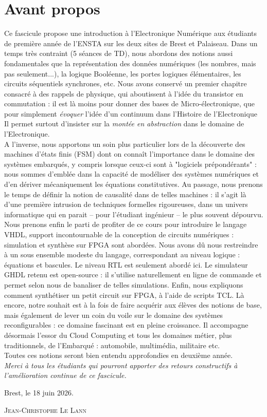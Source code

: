 \chapter*{Avant propos}

Ce fascicule propose une introduction à l'Electronique Numérique aux étudiants de première année
de l'ENSTA sur les deux sites de Brest et Palaiseau. Dans un temps très contraint (5 séances de TD), nous abordons des notions
aussi fondamentales que la représentation des données numériques (les nombres, mais pas seulement...),
la logique Booléenne, les portes logiques élémentaires, les circuits séquentiels synchrones, etc. Nous avons conservé
un premier chapitre consacré à des rappels de physique, qui aboutissent à l'idée du transistor en commutation : il est là
moins pour donner des bases de Micro-électronique, que pour simplement {\it évoquer} l'idée d'un continuum dans l'Histoire de l'Electronique
Il permet surtout d'insister sur la {\it montée en abstraction} dans le domaine de l'Electronique.\\

A l'inverse, nous apportons un soin plus particulier lors de la découverte des machines d'états finis (FSM) dont on connaît l'importance dans le domaine
des systèmes embarqués, y compris lorsque ceux-ci sont à "logiciels prépondérants" : nous sommes  d'emblée
dans la capacité de modéliser des systèmes numériques et d'en dériver mécaniquement les équations constitutives.
Au passage, nous prenons le temps de définir la notion de causalité dans de telles machines : il s'agit là
d'une première intrusion de techniques formelles rigoureuses, dans un univers informatique qui en parait -- pour l'étudiant ingénieur -- le plus souvent
dépourvu.\\

Nous prenons enfin le parti de profiter de ce cours pour introduire le langage VHDL, support incontournable
de la conception de circuits numériques : simulation et synthèse sur FPGA sont abordées. Nous avons dû nous restreindre
à un sous ensemble modeste du langage, correspondant au niveau logique : équations et bascules. Le niveau RTL est seulement abordé ici.
Le simulateur GHDL retenu est open-source : il s'utilise naturellement en ligne de commande et permet selon nous de banaliser de telles simulations.
Enfin, nous expliquons comment synthétiser un petit circuit sur FPGA, à l'aide de scripts TCL.
Là encore, notre souhait est à la fois de faire acquérir aux élèves des notions de base, mais également de lever un coin du voile
sur le domaine des systèmes reconfigurables : ce domaine fascinant est en pleine croissance. Il accompagne désormais l'essor du Cloud Computing et tous les domaines
métier, plus traditionnels, de l'Embarqué : automobile, multimédia, militaire etc.\\

Toutes ces notions seront bien entendu approfondies en deuxième année.\\

{\it Merci à tous les étudiants qui pourront apporter des retours constructifs à l'amélioration continue de ce fascicule.}

\begin{flushright}
Brest, le 18 juin 2026.

\textsc{Jean-Christophe Le Lann}
\end{flushright}
